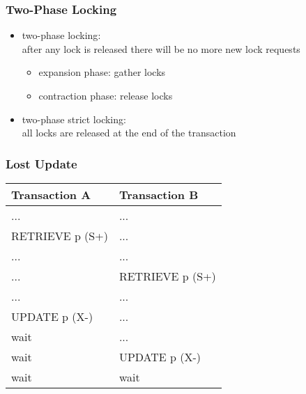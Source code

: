 \documentclass[dvipsnames]{beamer}
\theoremstyle{plain}
\begin{document}
\begin{frame}
  \frametitle{Two-Phase Locking}

  \begin{itemize}
    \item \alert{two-phase locking}:\\
      after any lock is released there will be no more new lock requests
    \begin{itemize}
      \item expansion phase: gather locks
      \item contraction phase: release locks
    \end{itemize}

    \pause
    \item \alert{two-phase strict locking}:\\
      all locks are released at the end of the transaction
  \end{itemize}
\end{frame}

\begin{frame}[fragile]
  \frametitle{Lost Update}

  \begin{example}
    \begin{table}
      \begin{tabular}{ll}
Transaction A   & Transaction B  \\\hline
...             & ...            \\\pause
RETRIEVE p (S+) & ...            \\\pause
...             & ...            \\
...             & RETRIEVE p (S+)\\\pause
...             & ...            \\
UPDATE p (X-)   & ...            \\
wait            & ...            \\\pause
wait            & UPDATE p (X-)  \\
wait            & wait
      \end{tabular}
    \end{table}
  \end{example}
\end{frame}
\end{document}
